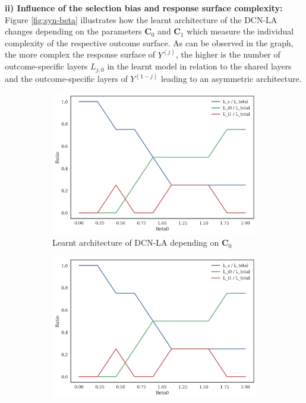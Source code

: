 \textbf{ii) Influence of the selection bias and response surface complexity:}
Figure \ref{fig:syn-beta} illustrates how the learnt architecture of the DCN-LA changes depending on the parameters $\mathbf{C}_0$ and $\mathbf{C}_1$ which measure the individual complexity of the respective outcome surface. As can be observed in the graph, the more complex the response surface of $Y^{(j)}$, the higher is the number of outcome-specific layers $L_{j,0}$ in the learnt model in relation to the shared layers and the outcome-specific layers of $Y^{(1-j)}$ leading to an asymmetric architecture. 

 \begin{figure}[h]
	\centering
	\caption[ The average and standard deviation of critical parameters ]
	{\small The average and standard deviation of critical parameters: Region R4} 
	\label{fig:syn-beta}
	\begin{subfigure}[b]{0.475\textwidth}
		\centering
		\includegraphics[width=\textwidth]{figures/chapter-5/syn-ratio-beta0.png}
		\caption[Network2]%
		{{Learnt architecture of DCN-LA depending on $\mathbf{C}_0$}}    
		\label{fig:mean and std of net14}
	\end{subfigure}
	\hfill
	\begin{subfigure}[b]{0.475\textwidth}  
		\centering 
		\includegraphics[width=\textwidth]{figures/chapter-5/syn-ratio-beta0.png}

\end{subfigure}
\end{figure}
